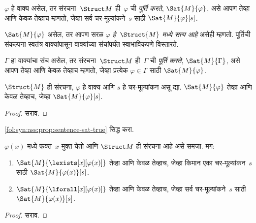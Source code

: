 \begin{defn}
\label{fol:syn:ass:defn:satisfaction}
$\varphi$ हे वाक्य असेल, तर संरचना~$\Struct M$ ही~$\varphi$ ची
\emph{पूर्ति करते}, $\Sat{M}{\varphi}$, असे आपण तेव्हा आणि केवळ तेव्हाच
म्हणतो, जेव्हा सर्व चर-मूल्यांकने~$s$ साठी $\Sat{M}{\varphi}[s]$.
\end{defn}

$\Sat{M}{\varphi}$ असेल, तर आपण सरळ \emph{$\varphi$ हे~$\Struct{M}$ मध्ये सत्य
आहे} असेही म्हणतो. पूर्तिची संकल्पना स्वतंत्र वाक्यांपासून
वाक्यांच्या संचांपर्यंत स्वाभाविकपणे विस्तारते.

\begin{defn}
\label{fol:syn:ass:defn:sat}
$\Gamma$ हा वाक्यांचा संच असेल, तर संरचना~$\Struct M$
ही~$\Gamma$ ची \emph{पूर्ति करते}, $\Sat{M}{\Gamma}$, असे आपण तेव्हा
आणि केवळ तेव्हाच म्हणतो, जेव्हा प्रत्येक $\varphi \in \Gamma$ साठी
$\Sat{M}{\varphi}$.

\end{defn}

\begin{prop}\label{fol:syn:ass:prop:sentence-sat-true}
  $\Struct{M}$ ही संरचना, $\varphi$ हे वाक्य आणि $s$ हे
  चर-मूल्यांकन असू द्या. $\Sat{M}{\varphi}$ तेव्हा आणि केवळ तेव्हाच,
  जेव्हा $\Sat{M}{\varphi}[s]$.
\end{prop}

\begin{proof}
सराव.
\end{proof}

\begin{prob}
\ref{fol:syn:ass:prop:sentence-sat-true} सिद्ध करा.
\end{prob}

\begin{prop}\label{fol:syn:ass:prop:sat-quant}
  $\varphi(x)$ मध्ये फक्त~$x$ मुक्त येतो आणि $\Struct M$ ही
  संरचना आहे असे समजा. मग:
  \begin{enumerate}
    \item $\Sat{M}{\lexists[x][\varphi(x)]}$ तेव्हा आणि केवळ
      तेव्हाच, जेव्हा किमान एका चर-मूल्यांकन~$s$ साठी
      $\Sat{M}{\varphi(x)}[s]$.
    \item $\Sat{M}{\lforall[x][\varphi(x)]}$ तेव्हा आणि केवळ
      तेव्हाच, जेव्हा सर्व चर-मूल्यांकने~$s$ साठी
      $\Sat{M}{\varphi(x)}[s]$.
\end{enumerate}
\end{prop}

\begin{proof}
सराव.
\end{proof}

